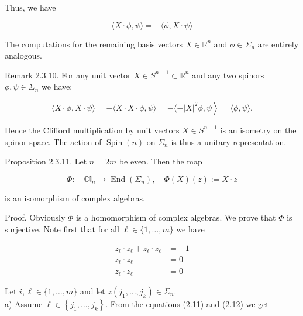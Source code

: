 \documentclass[10pt, letterpaper]{article}
\begin{document}
Thus, we have

$$
\langle X \cdot \phi, \psi\rangle=-\langle\phi, X \cdot \psi\rangle
$$

The computations for the remaining basis vectors $X \in \mathbb{R}^{n}$ and $\phi \in \Sigma_{n}$ are entirely analogous.

Remark 2.3.10. For any unit vector $X \in S^{n-1} \subset \mathbb{R}^{n}$ and any two spinors $\phi, \psi \in \Sigma_{n}$ we have:

$$
\left.\langle X \cdot \phi, X \cdot \psi\rangle=-\langle X \cdot X \cdot \phi, \psi\rangle=-\left.\langle-| X\right|^{2} \phi, \psi\right\rangle=\langle\phi, \psi\rangle .
$$

Hence the Clifford multiplication by unit vectors $X \in S^{n-1}$ is an isometry on the spinor space. The action of $\operatorname{Spin}(n)$ on $\Sigma_{n}$ is thus a unitary representation.

Proposition 2.3.11. Let $n=2 m$ be even. Then the map

$$
\Phi: \quad \mathbb{C l}_{n} \rightarrow \operatorname{End}\left(\Sigma_{n}\right), \quad \Phi(X)(z):=X \cdot z
$$

is an isomorphism of complex algebras.

Proof. Obviously $\Phi$ is a homomorphism of complex algebras. We prove that $\Phi$ is surjective. Note first that for all $\ell \in\{1, \ldots, m\}$ we have

$$
\begin{aligned}
z_{\ell} \cdot \bar{z}_{\ell}+\bar{z}_{\ell} \cdot z_{\ell} & =-1 \\
\bar{z}_{\ell} \cdot \bar{z}_{\ell} & =0 \\
z_{\ell} \cdot z_{\ell} & =0
\end{aligned}
$$

Let $i, \ell \in\{1, \ldots, m\}$ and let $z\left(j_{1}, \ldots, j_{k}\right) \in \Sigma_{n}$.\\
a) Assume $\ell \in\left\{j_{1}, \ldots, j_{k}\right\}$. From the equations (2.11) and (2.12) we get
\end{document}

